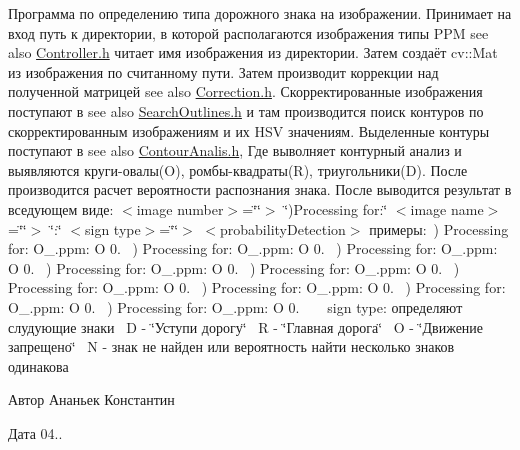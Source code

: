 Программа по определению типа дорожного знака на изображении. Принимает на вход путь к директории, в которой располагаются изображения типы P\+P\+M see also \hyperlink{_controller_8h}{Controller.\+h} читает имя изображения из директории. Затем создаёт cv\+::\+Mat из изображения по считанному пути. Затем производит коррекции над полученной матрицей see also \hyperlink{_correction_8h}{Correction.\+h}. Скорректированные изображения поступают в see also \hyperlink{_search_outlines_8h}{Search\+Outlines.\+h} и там производится поиск контуров по скорректированным изображениям и их H\+S\+V значениям. Выделенные контуры поступают в see also \hyperlink{_contour_analis_8h}{Contour\+Analis.\+h}, Где выволняет контурный анализ и выявляются круги-\/овалы(O), ромбы-\/квадраты(R), триугольники(\+D). После производится расчет вероятности распознания знака. После выводится результат в вседующем виде\+: $<$image number$>$=\char`\"{}\char`\"{}$>$ \char`\"{})\+Processing for\+:\char`\"{} $<$image name$>$=\char`\"{}\char`\"{}$>$ \char`\"{}\+:\char`\"{} $<$sign type$>$=\char`\"{}\char`\"{}$>$ $<$probability\+Detection$>$ примеры\+:~) Processing for\+: O\+\_.\+ppm\+: O 0. ~) Processing for\+: O\+\_.\+ppm\+: O 0. ~) Processing for\+: O\+\_.\+ppm\+: O 0. ~) Processing for\+: O\+\_.\+ppm\+: O 0. ~) Processing for\+: O\+\_.\+ppm\+: O 0. ~) Processing for\+: O\+\_.\+ppm\+: O 0. ~) Processing for\+: O\+\_.\+ppm\+: O 0. ~) Processing for\+: O\+\_.\+ppm\+: O 0. ~) Processing for\+: O\+\_.\+ppm\+: O 0. ~\newline
 ~\newline
 sign type\+: определяют слудующие знаки~\newline
 D -\/ \char`\"{}Уступи дорогу\char`\"{}~\newline
 R -\/ \char`\"{}Главная дорога\char`\"{}~\newline
 O -\/ \char`\"{}Движение запрещено\char`\"{}~\newline
 N -\/ знак не найден или вероятность найти несколько знаков одинакова ~\newline
 \begin{DoxyAuthor}{Автор}
Ананьек Константин
\end{DoxyAuthor}
\begin{DoxyDate}{Дата}
04.. 
\end{DoxyDate}
